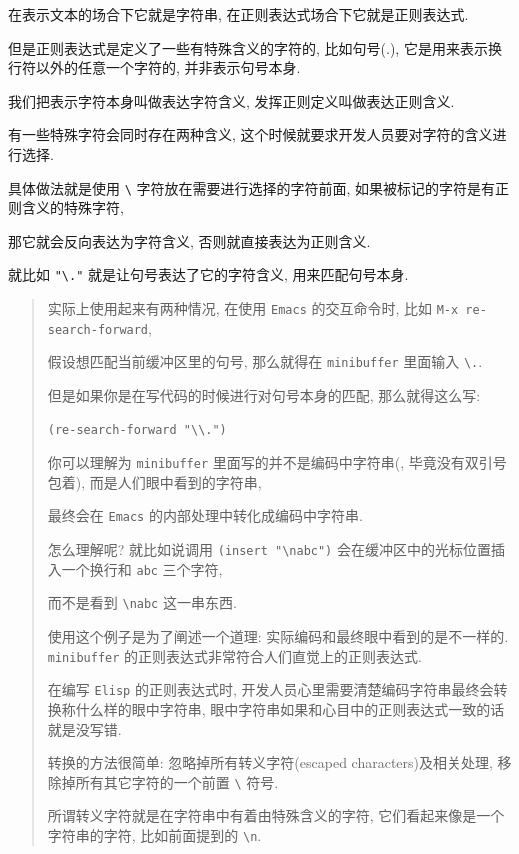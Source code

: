 \documentclass[11pt]{article}
\begin{document}
\begin{itemize}
在表示文本的场合下它就是字符串, 在正则表达式场合下它就是正则表达式.

但是正则表达式是定义了一些有特殊含义的字符的, 比如句号(.), 它是用来表示换行符以外的任意一个字符的, 并非表示句号本身.

我们把表示字符本身叫做表达字符含义, 发挥正则定义叫做表达正则含义.

有一些特殊字符会同时存在两种含义, 这个时候就要求开发人员要对字符的含义进行选择.

具体做法就是使用 \texttt{\textbackslash{}} 字符放在需要进行选择的字符前面, 如果被标记的字符是有正则含义的特殊字符,

那它就会反向表达为字符含义, 否则就直接表达为正则含义.

就比如 \texttt{"\textbackslash{}."} 就是让句号表达了它的字符含义, 用来匹配句号本身.

\begin{quote}
实际上使用起来有两种情况, 在使用 \texttt{Emacs} 的交互命令时, 比如 \texttt{M-x re-search-forward},

假设想匹配当前缓冲区里的句号, 那么就得在 \texttt{minibuffer} 里面输入 \texttt{\textbackslash{}.}.

但是如果你是在写代码的时候进行对句号本身的匹配, 那么就得这么写:

\begin{verbatim}
(re-search-forward "\\.")
\end{verbatim}

你可以理解为 \texttt{minibuffer} 里面写的并不是编码中字符串(, 毕竟没有双引号包着), 而是人们眼中看到的字符串,

最终会在 \texttt{Emacs} 的内部处理中转化成编码中字符串.

怎么理解呢? 就比如说调用 \texttt{(insert "\textbackslash{}nabc")} 会在缓冲区中的光标位置插入一个换行和 \texttt{abc} 三个字符,

而不是看到 \texttt{\textbackslash{}nabc} 这一串东西.

使用这个例子是为了阐述一个道理: 实际编码和最终眼中看到的是不一样的. \texttt{minibuffer} 的正则表达式非常符合人们直觉上的正则表达式.

在编写 \texttt{Elisp} 的正则表达式时, 开发人员心里需要清楚编码字符串最终会转换称什么样的眼中字符串, 眼中字符串如果和心目中的正则表达式一致的话就是没写错.

转换的方法很简单: 忽略掉所有转义字符(escaped characters)及相关处理, 移除掉所有其它字符的一个前置 \texttt{\textbackslash{}} 符号.

所谓转义字符就是在字符串中有着由特殊含义的字符, 它们看起来像是一个字符串的字符, 比如前面提到的 \texttt{\textbackslash{}n}.


\end{quote}
\end{itemize}
\end{document}
